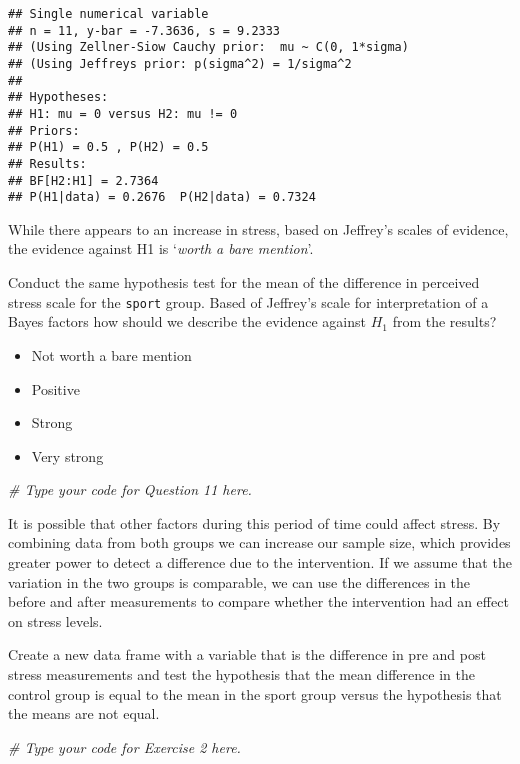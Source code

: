 \documentclass[]{article}
\newenvironment{Shaded}{\begin{snugshade}}{\end{snugshade}}
\newcommand{\CommentTok}[1]{\textcolor[rgb]{0.56,0.35,0.01}{\textit{#1}}}
\providecommand{\tightlist}{%
  \setlength{\itemsep}{0pt}\setlength{\parskip}{0pt}}
\begin{document}
\begin{verbatim}
## Single numerical variable
## n = 11, y-bar = -7.3636, s = 9.2333
## (Using Zellner-Siow Cauchy prior:  mu ~ C(0, 1*sigma)
## (Using Jeffreys prior: p(sigma^2) = 1/sigma^2
## 
## Hypotheses:
## H1: mu = 0 versus H2: mu != 0
## Priors:
## P(H1) = 0.5 , P(H2) = 0.5
## Results:
## BF[H2:H1] = 2.7364
## P(H1|data) = 0.2676  P(H2|data) = 0.7324
\end{verbatim}

While there appears to an increase in stress, based on Jeffrey's scales
of evidence, the evidence against H1 is `\emph{worth a bare mention}'.

Conduct the same hypothesis test for the mean of the difference in
perceived stress scale for the \texttt{sport} group. Based of Jeffrey's
scale for interpretation of a Bayes factors how should we describe the
evidence against \(H_1\) from the results?

\begin{itemize}
\tightlist
\item
  Not worth a bare mention
\item
  Positive
\item
  Strong
\item
  Very strong
\end{itemize}

\begin{Shaded}
\begin{Highlighting}[]
\CommentTok{# Type your code for Question 11 here.}
\end{Highlighting}
\end{Shaded}

It is possible that other factors during this period of time could
affect stress. By combining data from both groups we can increase our
sample size, which provides greater power to detect a difference due to
the intervention. If we assume that the variation in the two groups is
comparable, we can use the differences in the before and after
measurements to compare whether the intervention had an effect on stress
levels.

Create a new data frame with a variable that is the difference in pre
and post stress measurements and test the hypothesis that the mean
difference in the control group is equal to the mean in the sport group
versus the hypothesis that the means are not equal.

\begin{Shaded}
\begin{Highlighting}[]
\CommentTok{# Type your code for Exercise 2 here.}
\end{Highlighting}
\end{Shaded}
\end{document}
